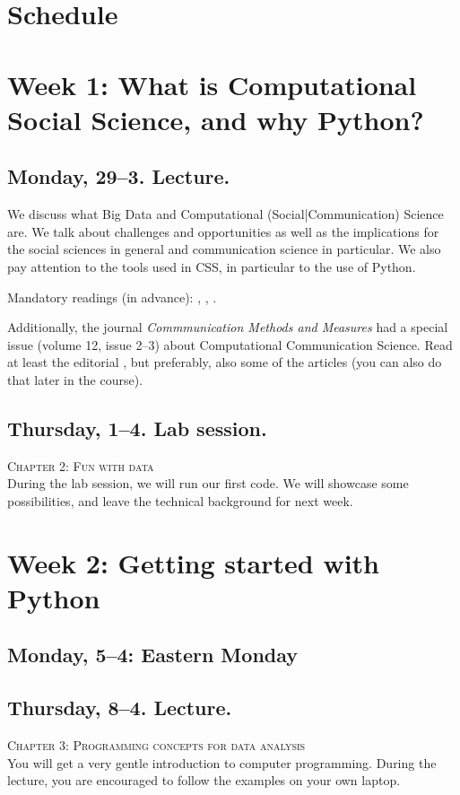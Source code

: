 \section*{Schedule}

\section*{Week 1: What is Computational Social Science, and why Python?}
\subsection*{Monday, 29--3. Lecture.}
We discuss what Big Data and Computational (Social|Communication) Science are. We talk about challenges and opportunities as well as the implications for the social sciences in general and communication science in particular. We also pay attention to the tools used in CSS, in particular to the use of Python.

Mandatory readings (in advance):  \cite{boyd2012}, \cite{Kitchin2014}, \cite{Hilbert2019}.

Additionally, the journal \textit{Commmunication Methods and Measures} had a special issue (volume 12, issue 2--3) about Computational Communication Science. Read at least the editorial \citep{VanAtteveldt2018a}, but preferably, also some of the articles (you can also do that later in the course).


\subsection*{Thursday, 1--4. Lab session.}
\textsc{ Chapter 2: Fun with data}\\

During the lab session, we will run our first code. We will showcase some possibilities, and leave the technical background for next week.

\section*{Week 2: Getting started with Python  }

\subsection*{Monday, 5--4: Eastern Monday}

\subsection*{Thursday, 8--4. Lecture.}
\textsc{ Chapter 3: Programming concepts for data analysis}\\
You will get a very gentle introduction to computer programming. During the lecture, you are encouraged to follow the examples on your own laptop.


